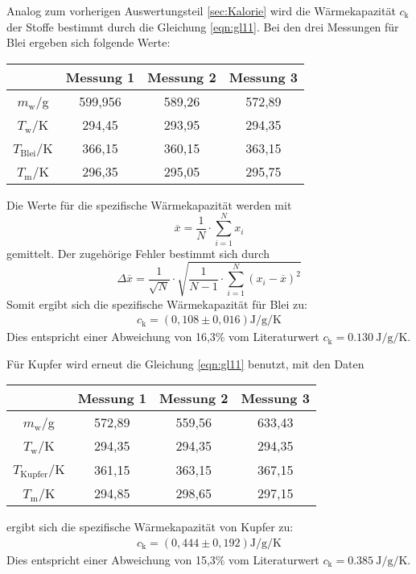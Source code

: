 Analog zum vorherigen Auswertungsteil \ref{sec:Kalorie} wird die Wärmekapazität $c_\text{k}$ der Stoffe bestimmt durch die Gleichung \eqref{eqn:gl11}.
Bei den drei Messungen für Blei ergeben sich folgende Werte:
\begin{table}
  \centering
  \label{tab:WerteBlei}
  \begin{tabular}{c c c c}
   \toprule
   & Messung 1 & Messung 2 & Messung 3 \\
   \midrule
   $m_\text{w}$/g & 599,956 & 589,26 & 572,89 \\
   $T_\text{w}$/K & 294,45 & 293,95 & 294,35 \\
   $T_\text{Blei}$/K & 366,15 & 360,15 & 363,15 \\
   $T_\text{m}$/K & 296,35 & 295,05 & 295,75 \\
   \bottomrule
  \end{tabular}
\end{table}
\FloatBarrier
Die Werte für die spezifische Wärmekapazität werden mit
\begin{equation}
  \overline{x} = \frac{1}{N} \cdot \sum_{i=1}^N x_i
\end{equation}
gemittelt. Der zugehörige Fehler bestimmt sich durch
\begin{equation}
  \Delta \overline{x} = \frac{1}{\sqrt{N}} \cdot \sqrt{\frac{1}{N-1} \cdot \sum_{i=1}^N \left(x_i - \overline{x}\right)^2}
\end{equation}
Somit ergibt sich die spezifische Wärmekapazität für Blei zu:
\begin{align*}
  c_\text{k} = \left(0,108 \pm 0,016 \right) \si{\joule\per\gram\per\kelvin}
\end{align*}
Dies entspricht einer Abweichung von 16,3\% vom Literaturwert $c_\text{k} = \SI{0,130}{\joule\per\gram\per\kelvin}$.

Für Kupfer wird erneut die Gleichung \eqref{eqn:gl11} benutzt, mit den Daten
\begin{table}
  \centering
  \label{tab:WerteKupfer}
  \begin{tabular}{c c c c}
   \toprule
   & Messung 1 & Messung 2 & Messung 3 \\
   \midrule
   $m_\text{w}$/g & 572,89 & 559,56 & 633,43 \\
   $T_\text{w}$/K & 294,35 & 294,35 & 294,35 \\
   $T_\text{Kupfer}$/K & 361,15 & 363,15 & 367,15 \\
   $T_\text{m}$/K & 294,85 & 298,65 & 297,15 \\
   \bottomrule
  \end{tabular}
\end{table}
\FloatBarrier
ergibt sich die spezifische Wärmekapazität von Kupfer zu:
\begin{align*}
  c_\text{k} = \left(0,444 \pm 0,192 \right) \si{\joule\per\gram\per\kelvin}
\end{align*}
Dies entspricht einer Abweichung von 15,3\% vom Literaturwert $c_\text{k} = \SI{0,385}{\joule\per\gram\per\kelvin}$.

